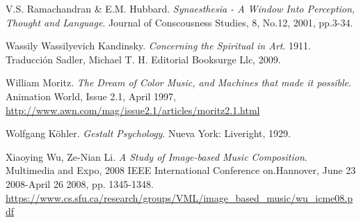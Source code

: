 \begin{thebibliography}{9}
  V.S. Ramachandran \& E.M. Hubbard. \emph{Synaesthesia - A Window Into Perception, Thought and Language}. Journal of Conscousness Studies, 8, No.12, 2001, pp.3-34.

 Wassily Wassilyevich Kandinsky. \emph{Concerning the Spiritual in Art}. 1911. Traducción Sadler, Michael T. H. Editorial Booksurge Llc, 2009.

 William Moritz. \emph{The Dream of Color Music, and Machines that made it possible}. Animation World, Issue 2.1, April 1997,\\ 
 \url{http://www.awn.com/mag/issue2.1/articles/moritz2.1.html}

 Wolfgang Köhler. \emph{Gestalt Psychology}. Nueva York: Liveright, 1929.

 Xiaoying Wu, Ze-Nian Li. \emph{A Study of Image-based Music Composition}. Multimedia and Expo, 2008 IEEE International Conference on.Hannover, June 23 2008-April 26 2008, pp. 1345-1348.\\
 \url{https://www.cs.sfu.ca/research/groups/VML/image_based_music/wu_icme08.pdf}
\end{thebibliography}